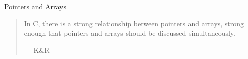 \begin{frame}{}
  \centerline{\LARGE Pointers and Arrays}

  \vspace{0.80cm}
  \begin{quote}
    In C, there is a strong relationship between pointers and arrays,
    strong enough that pointers and arrays should be discussed simultaneously.

    \hfill --- K\&R
  \end{quote}
\end{frame}




